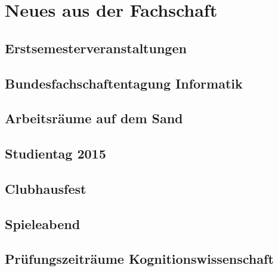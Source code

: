 \documentclass{fsinewsletter}
\title{}
\author{}
\begin{document}



\tableofcontents
\newpage



\newpage

\section{Neues aus der Fachschaft}
%

\subsection{Erstsemesterveranstaltungen}


\subsection{Bundesfachschaftentagung Informatik}

\vfill
\subsection{Arbeitsräume auf dem Sand}


\subsection{Studientag 2015}


\subsection{Clubhausfest}


\subsection{Spieleabend}


\subsection{Prüfungszeiträume Kognitionswissenschaft}

\end{document}
